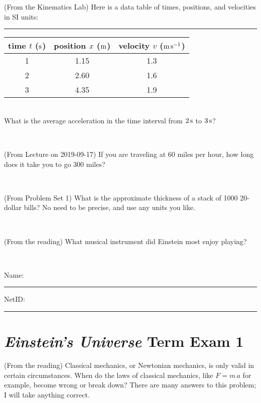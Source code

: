 \documentclass[12pt, letterpaper]{article}
\begin{document}
\clearpage


\begin{problem} (From the Kinematics Lab)
Here is a data table of times, positions, and velocities in SI units:\\
\rule{1.0in}{0pt}\begin{tabular}{c|c|c}
time $t$ ($\mathrm{s}$) & position $x$ ($\mathrm{m}$) & velocity $v$ ($\mathrm{m}\,\mathrm{s}^{-1}$) \\
\hline
1 & 1.15 & 1.3 \\
2 & 2.60 & 1.6 \\
3 & 4.35 & 1.9 \\
\hline
\end{tabular}\\
What is the average acceleration in the time interval from $2\,\mathrm{s}$ to $3\,\mathrm{s}$?
\end{problem}


\vfill ~

\begin{problem} (From Lecture on 2019-09-17)
If you are traveling at 60 miles per hour, how long does
it take you to go 300 miles?
\end{problem}


\vfill ~

\begin{problem} (From Problem Set 1)
What is the approximate thickness of a stack of 1000 20-dollar bills?
No need to be precise, and use any units you like.
\end{problem}


\vfill ~

\begin{problem} (From the reading)
What musical instrument did Einstein most enjoy playing?
\end{problem}


\vfill ~


\cleardoublepage



\noindent
Name: \rule[-1ex]{0.60\textwidth}{0.1pt}
NetID: \rule[-1ex]{0.20\textwidth}{0.1pt}

\section*{\textsl{Einstein's Universe} Term Exam 1}
\setcounter{problem}{1}


\begin{problem} (From the reading)
Classical mechanics, or Newtonian mechanics, is only valid in certain
circumstances. When do the laws of classical mechanics, like $F =
m\,a$ for example, become wrong or break down? There are many answers
to this problem; I will take anything correct.
\end{problem}
\end{document}
